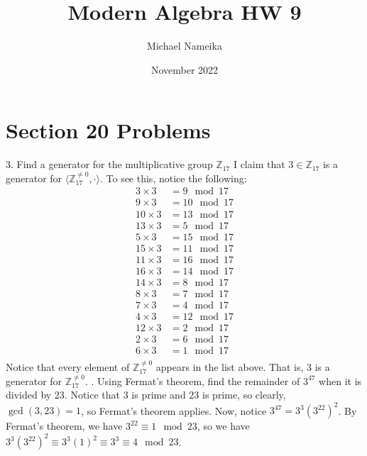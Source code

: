 \documentclass{article}
\title{Modern Algebra HW 9}
\author{Michael Nameika}
\date{November 2022}
\begin{document}
\maketitle

\section*{Section 20 Problems}
3. Find a generator for the multiplicative group $\mathbb{Z}_{17}$
\newline\newline
I claim that $3 \in \mathbb{Z}_{17}$ is a generator for $\langle \mathbb{Z}_{17}^{\neq 0}, \cdot \rangle$. To see this, notice the following:
\begin{align*}
    3 \times 3 &= 9 \mod 17 \\
    9 \times 3 &= 10 \mod 17 \\
    10 \times 3 &= 13 \mod 17 \\
    13 \times 3 &= 5 \mod 17\\
    5 \times 3 &= 15 \mod 17\\
    15 \times 3 &= 11 \mod 17\\
    11 \times 3 &= 16 \mod 17\\
    16 \times 3 &= 14 \mod 17\\
    14 \times 3 &= 8 \mod 17\\
    8 \times 3 &= 7 \mod 17\\
    7 \times 3 &= 4 \mod 17\\
    4 \times 3 &= 12 \mod 17\\
    12 \times 3 &= 2 \mod 17\\
    2 \times 3 &= 6 \mod 17\\
    6 \times 3 &= 1 \mod 17\\
\end{align*}
Notice that every element of $\mathbb{Z}_{17}^{\neq 0}$ appears in the list above. That is, $3$ is a generator for $\mathbb{Z}_{17}^{\neq 0}$.
\newline{}. Using Fermat's theorem, find the remainder of $3^{47}$ when it is divided by 23.
\newline\newline
Notice that $3$ is prime and $23$ is prime, so clearly, $\gcd{(3, 23)} = 1$, so Fermat's theorem applies. Now, notice $3^{47} = 3^3(3^{22})^2$. By Fermat's theorem, we have $3^{22} \equiv 1 \mod 23$, so we have $3^3(3^{22})^2 \equiv 3^3(1)^2 \equiv 3^3 \equiv 4 \mod 23$.
\newline
\end{document}
